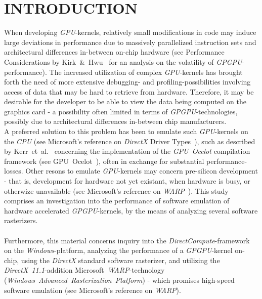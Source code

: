 \documentclass[a4paper,twocolumn,10pt]{article}
\begin{document}
\section{INTRODUCTION}
\label{sec:introduction}
When developing \textit{GPU}-kernels, relatively small modifications in code may induce large deviations in performance due to massively parallelized instruction sets and architectural differences in-between on-chip hardware (see Performance Considerations by Kirk~\&~Hwu~\cite[ch.~6]{Kirk:2010:PMP:1841511} for an analysis on the volatility of \textit{GPGPU}-performance). The increased utilization of complex \textit{GPU}-kernels has brought forth the need of more extensive debugging- and profiling-possibilities involving access of data that may be hard to retrieve from hardware. Therefore, it may be desirable for the developer to be able to view the data being computed on the graphics card - a possibility often limited in terms of \textit{GPGPU}-technologies, possibly due to architectural differences in-between chip manufacturers.\\
A preferred solution to this problem has been to emulate such \textit{GPU}-kernels on the \textit{CPU} (see Microsoft's reference on \textit{DirectX} Driver Types~), such as described by Kerr~et~al.~\cite[p.~416-419]{Hwu:2011:GCG:2103614} concerning the implementation of the \textit{GPU~Ocelot} compilation framework (see GPU~Ocelot~), often in exchange for substantial performance-losses. Other resons to emulate \textit{GPU}-kernels may concern pre-silicon development - that is, development for hardware not yet existant, when hardware is busy, or otherwize unavailable (see Microsoft's reference on \textit{WARP}~). This study comprises an investigation into the performance of software emulation of hardware accelerated \textit{GPGPU}-kernels, by the means of analyzing several software rasterizers.\\
\\
Furthermore, this material concerns inquiry into the \textit{DirectCompute}-framework on the \textit{Windows}-platform, analyzing the performance of a \textit{GPGPU}-kernel on-chip, using the \textit{DirectX} standard software rasterizer, and utilizing the \textit{DirectX~11.1}-addition Microsoft~\textit{WARP}-technology (\textit{Windows~Advanced~Rasterization~Platform}) - which promises high-speed software emulation (see Microsoft's reference on \textit{WARP}).\\
\\
\end{document}
